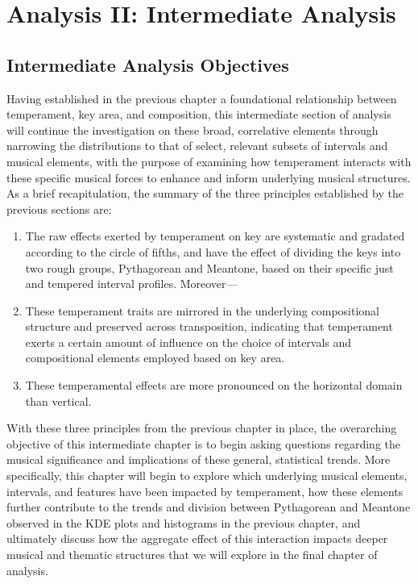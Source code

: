     
    
    

    \hypertarget{Analysis II: Intermediate Analysis}{\chapter{Analysis II: Intermediate Analysis}\label{Analysis II: Intermediate Analysis}}


    \section{Intermediate Analysis
Objectives}\label{intermediate-analysis-objectives}

    Having established in the previous chapter a foundational relationship
between temperament, key area, and composition, this intermediate
section of analysis will continue the investigation on these broad,
correlative elements through narrowing the distributions to that of
select, relevant subsets of intervals and musical elements, with the
purpose of examining how temperament interacts with these specific
musical forces to enhance and inform underlying musical structures. As a
brief recapitulation, the summary of the three principles established by
the previous sections are:

\begin{enumerate}
\def\labelenumi{\arabic{enumi}.}
\tightlist
\item
  The raw effects exerted by temperament on key are systematic and
  gradated according to the circle of fifths, and have the effect of
  dividing the keys into two rough groups, Pythagorean and Meantone,
  based on their specific just and tempered interval profiles.
  Moreover---
\item
  These temperament traits are mirrored in the underlying compositional
  structure and preserved across transposition, indicating that
  temperament exerts a certain amount of influence on the choice of
  intervals and compositional elements employed based on key area.
\item
  These temperamental effects are more pronounced on the horizontal
  domain than vertical.
\end{enumerate}

With these three principles from the previous chapter in place, the
overarching objective of this intermediate chapter is to begin asking
questions regarding the musical significance and implications of these
general, statistical trends. More specifically, this chapter will begin
to explore which underlying musical elements, intervals, and features
have been impacted by temperament, how these elements further contribute
to the trends and division between Pythagorean and Meantone observed in
the KDE plots and histograms in the previous chapter, and ultimately
discuss how the aggregate effect of this interaction impacts deeper
musical and thematic structures that we will explore in the final
chapter of analysis.

